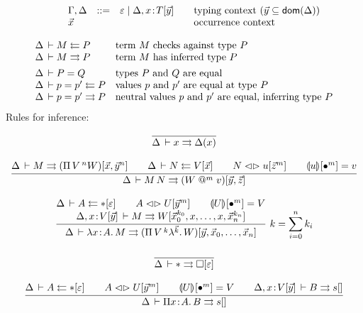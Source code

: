 \documentclass[a4paper]{article}
\makeatletter
\newcommand{\ovar}{\mathord{\bullet}}
\newcommand{\olam}[1]{\lambda^{#1}.\,}
\newcommand{\opi}[2]{\Pi\,#1\,^{#2}}
\newcommand{\lrhd}{\mathrel{\mathord{\lhd}\mathord{\rhd}}}
\newcommand{\osyn}[3]{#1 \lrhd \esubst{#2}{#3}}
\renewcommand{\esubst}[2]{#1[#2]}
\renewcommand{\cempty}{\varepsilon}
\renewcommand{\sempty}{\varepsilon}
\newcommand{\oclos}[2]{#1[#2]}
\newcommand{\ochk}[4]{#1 \der #2 \jchk \oclos{#4}{#3}}
\newcommand{\oinf}[4]{#1 \der #2 \jinf \oclos{#4}{#3}}
\newcommand{\vapp}[1]{\mathrel{@^{#1}}}
\renewcommand{\eval}[2]{\dent{#1}{}[#2]}
\newcommand{\evalid}[2]{\dent{#1}{}[\ovar^{#2}]}
\makeatother
\begin{document}
\[
\begin{array}{lllrl@{\qquad}l}
&& \Gamma,\Delta & ::= & \cempty \mid \Delta, x \of \oclos{T}{\vec y} 
  & \mbox{typing context } (\vec y \subseteq \dom(\Delta)) 
\\
&& \vec x &&& \mbox{occurrence context} \\
\end{array}
\]

\[
\begin{array}{ll}
  \Delta \,\vdash M \leftleftarrows P & \mbox{term $M$ checks against type $P$}
  \\
  \Delta \,\vdash M \rightrightarrows P & \mbox{term $M$ has inferred type $P$}
  \\[1ex]
  \Delta \,\vdash P = Q & \mbox{types $P$ and $Q$ are equal}
  \\
  \Delta \,\vdash p = p' \leftleftarrows P & \mbox{values $p$ and $p'$ are equal at
    type $P$} 
  \\
  \Delta \,\vdash p = p' \rightrightarrows P & \mbox{neutral values $p$ and $p'$ are
    equal, inferring type $P$} 
  \\
\end{array}
\]
Rules for inference:
\begin{gather*}
  \ru{}{\Delta \der x \jinf \Delta(x)}
\\[2ex]
  \ru{\oinf \Delta M {\vec x,{\vec y}^n} {(\opi V n W)} \qquad
      \ochk \Delta N {\vec x} V \qquad
      \osyn N u {{\vec z}^m} \qquad
      \eval u {\ovar^m} = v
    }{\oinf \Delta {M\,N} {\vec y,\vec z} {(W \vapp m v)}} 
\\[2ex]
  \rux{\ochk \Delta A {\sempty} \ttype \qquad
      \osyn A U {{\vec y}^m} \qquad
      \evalid U m = V \\
      \oinf {\Delta, x \of \oclos V {\vec y}} M 
            {{\vec x_0}^{k_0},x,\dots,x,{\vec x_n}^{k_n}} W
    }{\oinf \Delta {\lambda x \of A.\,M} {\vec y,\vec x_0,\dots,\vec x_n} 
            {(\opi V {k} {\olam {\vec k} W})}
    }{k = \sum_{i=0}^n k_i}
\\[2ex]
  \ru{}{\oinf \Delta \ttype {\sempty} \tkind}
\\[2ex]
  \ru{\ochk \Delta A {\sempty} \ttype \qquad
      \osyn A U {{\vec y}^m} \qquad
      \evalid U m = V \qquad
      \oinf {\Delta, x \of \oclos V {\vec y}} B {} s
    }{\oinf \Delta {\Pi x \of A.\,B} {} s}
\end{gather*}
\end{document}
